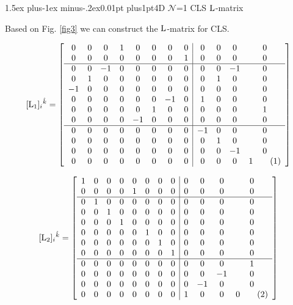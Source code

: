 \documentclass[12pt]{article}
\makeatletter
\newcommand\numberthis{\addtocounter{equation}{1}\tag{\theequation}}
\def\rL{{\rm L}}
\let\bm\relax
\newcommand{\bm}[1]{{\boldsymbol{#1}}}
\def\subsection{\@startsection{subsection}{2}{\z@}
         {1.5ex plus-1ex minus-.2ex}{0.01pt plus1pt}{\sf\slshape}}
\makeatother
\begin{document}
\subsection{4D $\mathcal{N}$=1 CLS $\bm\rL$-matrix}

Based on Fig. \ref{fig3} we can construct the $\bm\rL$-matrix for CLS.

\[
[{\bm{\rm L}_1}]_{i}{}^{\hat k}  = \left[\begin{array}{cccccccc|cccc}
    0 & 0 & 0 & 1 & 0 & 0 & 0 & 0 & 0 & 0 & 0 & 0 \\ 
    0 & 0 & 0 & 0 & 0 & 0 & 0 & 1 & 0 & 0 & 0 & 0 \\
    \hline
    0 & 0 & -1 & 0 & 0 & 0 & 0 & 0 & 0 & 0 & -1 & 0 \\ 
    0 & 1 & 0 & 0 & 0 & 0 & 0 & 0 & 0 & 1 & 0 & 0 \\ 
    -1 & 0 & 0 & 0 & 0 & 0 & 0 & 0 & 0 & 0 & 0 & 0 \\ 
    0 & 0 & 0 & 0 & 0 & 0 & -1 & 0 & 1 & 0 & 0 & 0 \\ 
    0 & 0 & 0 & 0 & 0 & 1 & 0 & 0 & 0 & 0 & 0 & 1 \\ 
    0 & 0 & 0 & 0 & -1 & 0 & 0 & 0 & 0 & 0 & 0 & 0 \\ 
    \hline
    0 & 0 & 0 & 0 & 0 & 0 & 0 & 0 & -1 & 0 & 0 & 0 \\ 
    0 & 0 & 0 & 0 & 0 & 0 & 0 & 0 & 0 & 1 & 0 & 0 \\ 
    0 & 0 & 0 & 0 & 0 & 0 & 0 & 0 & 0 & 0 & -1 & 0 \\ 
    0 & 0 & 0 & 0 & 0 & 0 & 0 & 0 & 0 & 0 & 0 & 1
\numberthis\end{array}\right] 
\label{eq6.1}\]

\[
[{\bm{\rm L}_2}]_{i}{}^{\hat k}  = \left[\begin{array}{cccccccc|cccc}
    1 & 0 & 0 & 0 & 0 & 0 & 0 & 0 & 0 & 0 & 0 & 0 \\ 
    0 & 0 & 0 & 0 & 1 & 0 & 0 & 0 & 0 & 0 & 0 & 0 \\ 
    \hline
    0 & 1 & 0 & 0 & 0 & 0 & 0 & 0 & 0 & 0 & 0 & 0 \\ 
    0 & 0 & 1 & 0 & 0 & 0 & 0 & 0 & 0 & 0 & 0 & 0 \\ 
    0 & 0 & 0 & 1 & 0 & 0 & 0 & 0 & 0 & 0 & 0 & 0 \\ 
    0 & 0 & 0 & 0 & 0 & 1 & 0 & 0 & 0 & 0 & 0 & 0 \\ 
    0 & 0 & 0 & 0 & 0 & 0 & 1 & 0 & 0 & 0 & 0 & 0 \\ 
    0 & 0 & 0 & 0 & 0 & 0 & 0 & 1 & 0 & 0 & 0 & 0 \\ 
    \hline
    0 & 0 & 0 & 0 & 0 & 0 & 0 & 0 & 0 & 0 & 0 & 1 \\ 
    0 & 0 & 0 & 0 & 0 & 0 & 0 & 0 & 0 & 0 & -1 & 0 \\ 
    0 & 0 & 0 & 0 & 0 & 0 & 0 & 0 & 0 & -1 & 0 & 0 \\ 
    0 & 0 & 0 & 0 & 0 & 0 & 0 & 0 & 1 & 0 & 0 & 0
\numberthis\end{array}\right] \]
\end{document}
